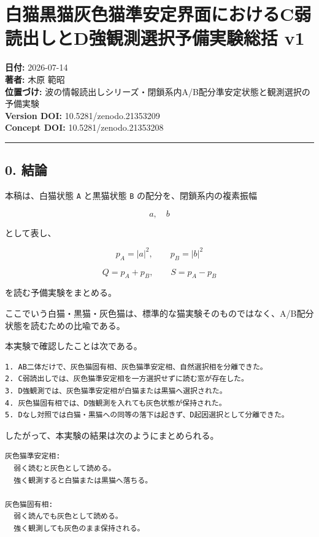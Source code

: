 \documentclass{article}
\begin{document}
\section{白猫黒猫灰色猫準安定界面におけるC弱読出しとD強観測選択予備実験総括
v1}\label{ux767dux732bux9ed2ux732bux7070ux8272ux732bux6e96ux5b89ux5b9aux754cux9762ux306bux304aux3051ux308bcux5f31ux8aadux51faux3057ux3068dux5f37ux89b3ux6e2cux9078ux629eux4e88ux5099ux5b9fux9a13ux7dcfux62ec-v1}

\textbf{日付:} 2026-07-14\\
\textbf{著者:} 木原 範昭\\
\textbf{位置づけ:}
波の情報読出しシリーズ・閉鎖系内A/B配分準安定状態と観測選択の予備実験\\
\textbf{Version DOI:} 10.5281/zenodo.21353209\\
\textbf{Concept DOI:} 10.5281/zenodo.21353208

\begin{center}\rule{0.5\linewidth}{0.5pt}\end{center}

\subsection{0. 結論}\label{ux7d50ux8ad6}

本稿は、白猫状態 \texttt{A} と黒猫状態 \texttt{B}
の配分を、閉鎖系内の複素振幅

\[
a,\quad b
\]

として表し、

\[
p_A=|a|^2,\qquad p_B=|b|^2
\]

\[
Q=p_A+p_B,\qquad S=p_A-p_B
\]

を読む予備実験をまとめる。

ここでいう白猫・黒猫・灰色猫は、標準的な猫実験そのものではなく、A/B配分状態を読むための比喩である。

本実験で確認したことは次である。

\begin{verbatim}
1. AB二体だけで、灰色猫固有相、灰色猫準安定相、自然選択相を分離できた。
2. C弱読出しでは、灰色猫準安定相を一方選択せずに読む窓が存在した。
3. D強観測では、灰色猫準安定相が白猫または黒猫へ選択された。
4. 灰色猫固有相では、D強観測を入れても灰色状態が保持された。
5. Dなし対照では白猫・黒猫への同等の落下は起きず、D起因選択として分離できた。
\end{verbatim}

したがって、本実験の結果は次のようにまとめられる。

\begin{verbatim}
灰色猫準安定相:
  弱く読むと灰色として読める。
  強く観測すると白猫または黒猫へ落ちる。

灰色猫固有相:
  弱く読んでも灰色として読める。
  強く観測しても灰色のまま保持される。
\end{verbatim}
\end{document}
